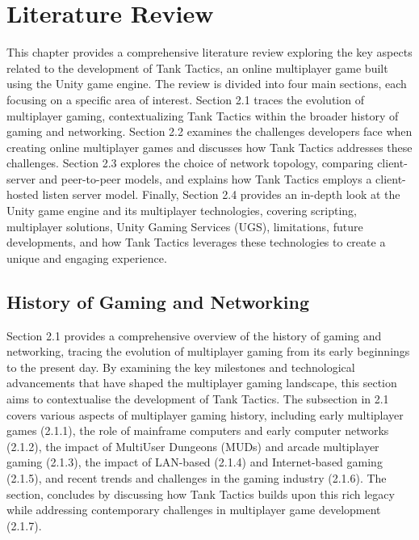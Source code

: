 \chapter{Literature Review}
\label{ch:lit_rev} %

This chapter provides a comprehensive literature review exploring the key aspects related to the development of Tank Tactics, an online multiplayer game built using the Unity game engine. The review is divided into four main sections, each focusing on a specific area of interest. Section 2.1 traces the evolution of multiplayer gaming, contextualizing Tank Tactics within the broader history of gaming and networking. Section 2.2 examines the challenges developers face when creating online multiplayer games and discusses how Tank Tactics addresses these challenges. Section 2.3 explores the choice of network topology, comparing client-server and peer-to-peer models, and explains how Tank Tactics employs a client-hosted listen server model. Finally, Section 2.4 provides an in-depth look at the Unity game engine and its multiplayer technologies, covering scripting, multiplayer solutions, Unity Gaming Services (UGS), limitations, future developments, and how Tank Tactics leverages these technologies to create a unique and engaging experience.

\section{History of Gaming and Networking}
Section 2.1 provides a comprehensive overview of the history of gaming and networking, tracing the evolution of multiplayer gaming from its early beginnings to the present day. By examining the key milestones and technological advancements that have shaped the multiplayer gaming landscape, this section aims to contextualise the development of Tank Tactics. The subsection in 2.1 covers various aspects of multiplayer gaming history, including early multiplayer games (2.1.1), the role of mainframe computers and early computer networks (2.1.2), the impact of MultiUser Dungeons (MUDs) and arcade multiplayer gaming (2.1.3), the impact of LAN-based (2.1.4) and Internet-based gaming (2.1.5), and recent trends and challenges in the gaming industry (2.1.6). The section, concludes by discussing how Tank Tactics builds upon this rich legacy while addressing contemporary challenges in multiplayer game development (2.1.7).

